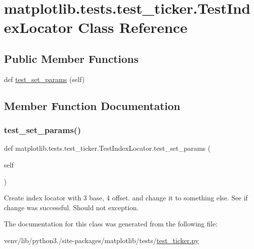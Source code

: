\hypertarget{classmatplotlib_1_1tests_1_1test__ticker_1_1TestIndexLocator}{}\section{matplotlib.\+tests.\+test\+\_\+ticker.\+Test\+Index\+Locator Class Reference}
\label{classmatplotlib_1_1tests_1_1test__ticker_1_1TestIndexLocator}
\subsection*{Public Member Functions}
\begin{DoxyCompactItemize}
\item 
def \hyperlink{classmatplotlib_1_1tests_1_1test__ticker_1_1TestIndexLocator_a443d6a84e18de7706422224f81765d27}{test\+\_\+set\+\_\+params} (self)
\end{DoxyCompactItemize}


\subsection{Member Function Documentation}
\mbox{\label{classmatplotlib_1_1tests_1_1test__ticker_1_1TestIndexLocator_a443d6a84e18de7706422224f81765d27}} 
\subsubsection{\texorpdfstring{test\+\_\+set\+\_\+params()}{test\_set\_params()}}
{\footnotesize\ttfamily def matplotlib.\+tests.\+test\+\_\+ticker.\+Test\+Index\+Locator.\+test\+\_\+set\+\_\+params (\begin{DoxyParamCaption}\item[{}]{self }\end{DoxyParamCaption})}

\begin{DoxyVerb}Create index locator with 3 base, 4 offset. and change it to something
else. See if change was successful.
Should not exception.
\end{DoxyVerb}
 

The documentation for this class was generated from the following file\+:\begin{DoxyCompactItemize}
\item 
venv/lib/python3./site-\/packages/matplotlib/tests/\hyperlink{test__ticker_8py}{test\+\_\+ticker.\+py}\end{DoxyCompactItemize}
